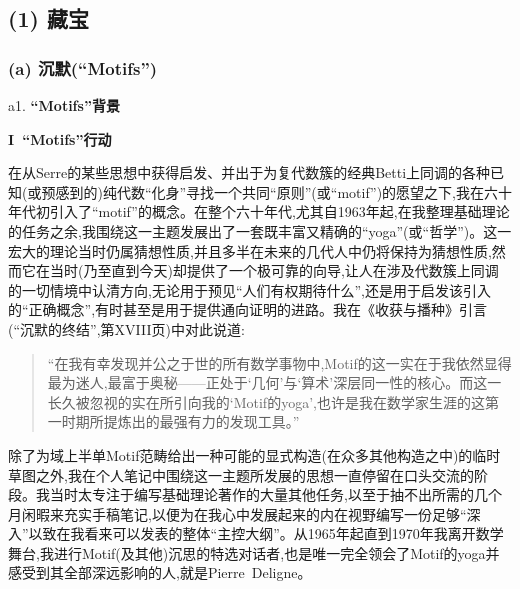 \subsection{(1) 藏宝}

\subsubsection*{(a) 沉默(“Motifs”)}

a1. \textbf{“Motifs”背景}


\textbf{I~“Motifs”行动}

在从Serre的某些思想中获得启发、并出于为复代数簇的经典Betti上同调的各种已知(或预感到的)纯代数“化身”寻找一个共同“原则”(或“motif”)的愿望之下,我在六十年代初引入了“motif”的概念。在整个六十年代,尤其自1963年起,在我整理基础理论的任务之余,我围绕这一主题发展出了一套既丰富又精确的“yoga”(或“哲学”)。这一宏大的理论当时仍属猜想性质,并且多半在未来的几代人中仍将保持为猜想性质,然而它在当时(乃至直到今天)却提供了一个极可靠的向导,让人在涉及代数簇上同调的一切情境中认清方向,无论用于预见“人们有权期待什么”,还是用于启发该引入的“正确概念”,有时甚至是用于提供通向证明的进路。我在《收获与播种》引言\dmark{}(“沉默的终结”,第XVIII页)中对此说道:

\begin{quote}
“在我有幸发现并公之于世的所有数学事物中,Motif的这一实在于我依然显得最为迷人,最富于奥秘——正处于‘几何’与‘算术’深层同一性的核心。而这一长久被忽视的实在所引向我的‘Motif的yoga’,也许是我在数学家生涯的这第一时期所提炼出的最强有力的发现工具。”
\end{quote}

除了为域上半单Motif范畴给出一种可能的显式构造(在众多其他构造之中)的临时草图之外,我在个人笔记中围绕这一主题所发展的思想一直停留在口头交流的阶段。我当时太专注于编写基础理论著作的大量其他任务,以至于抽不出所需的几个月闲暇来充实手稿笔记,以便为在我心中发展起来的内在视野编写一份足够“深入”以致在我看来可以发表的整体“主控大纲”。从1965年起直到1970年我离开数学舞台,我进行Motif(及其他)沉思的特选对话者,也是唯一完全领会了Motif的yoga并感受到其全部深远影响的人,就是Pierre~Deligne。

